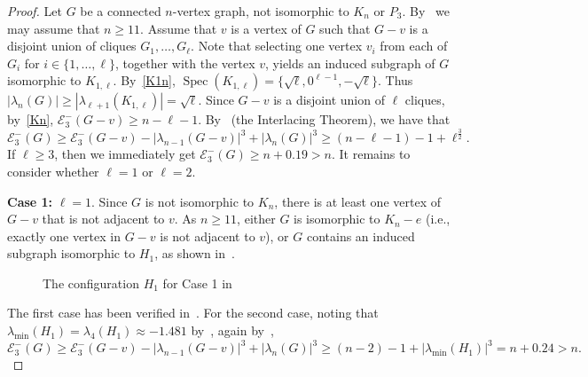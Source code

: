 \documentclass[a4paper,12pt]{article}
\theoremstyle{plain}
\begin{document}
\begin{proof}
Let $G$ be a connected $n$-vertex graph, not isomorphic to $K_n$ or $P_3$. By~ we may assume that $n \geq 11$. Assume that $v$ is a vertex of $G$ such that $G-v$ is a disjoint union of cliques $G_1, \ldots, G_\ell$. Note that selecting one vertex $v_i$ from each of $G_i$ for $i\in \{1,\ldots, \ell\}$, together with the vertex $v$, yields an induced subgraph of $G$ isomorphic to $K_{1,\ell}$. By~\ref{K1n}, $\operatorname{Spec}(K_{1,\ell})=\{\sqrt{\ell}, 0^{\ell-1},-\sqrt{\ell}\}$. Thus $|\lambda_n(G)| \geq |\lambda_{\ell+1}(K_{1,\ell})|= \sqrt{\ell}$. Since $G-v$ is a disjoint union of $\ell$ cliques, by~\ref{Kn}, $\mathcal{E}_3^{-}(G-v)\geq n-\ell-1$. By~ (the Interlacing Theorem), we have that
$$\mathcal{E}_3^{-}(G) \geq \mathcal{E}_3^{-}(G-v) - |\lambda_{n-1}(G - v)|^3 + |\lambda_n(G)|^3\geq(n-\ell-1)-1+\ell^{\frac{3}{2}}.$$ If $\ell\geq 3$, then we immediately get $\mathcal{E}_{3}^{-}(G)\geq n+0.19>n$. It remains to consider whether $\ell=1$ or $\ell=2$.

\noindent
\textbf{Case 1:} $\ell=1$. Since $G$ is not isomorphic to $K_n$, there is at least one vertex of $G-v$ that is not adjacent to $v$. As $n\geq 11$, either $G$ is isomorphic to $K_n-e$ (i.e., exactly one vertex in $G-v$ is not adjacent to $v$), or $G$ contains an induced subgraph isomorphic to $H_1$, as shown in~. 
\begin{figure}[ht]
\centering
{}
\caption{The configuration $H_1$ for Case 1 in }
\label{fig:H2}
\end{figure} 

The first case has been verified in~. For the second case, noting that  $\lambda_{\mathrm{min}}(H_1)=\lambda_{4}(H_1)\approx -1.481$ by~, again by~,
$$\mathcal{E}_{3}^{-}(G) 
\geq \mathcal{E}_{3}^{-}(G - v) - |\lambda_{n-1}(G - v)|^3 + |\lambda_n(G)|^3 \geq (n - 2) - 1 + |\lambda_{\mathrm{min}}(H_1)|^3
= n + 0.24>n.$$


\end{proof}
\end{document}
